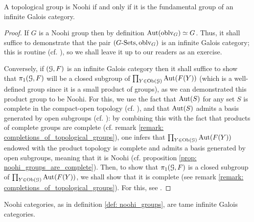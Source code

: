             \begin{lemma} \label{lemma: fundamental_groups_of_infinite_galois_categories_are_noohi}
                A topological group is Noohi if and only if it is the fundamental group of an infinite Galois category.
            \end{lemma}
                \begin{proof}
                    If $G$ is a Noohi group then by definition $\mathrm{Aut}(\mathrm{oblv}_G) \simeq G$. Thus, it shall suffice to demonstrate that the pair $(G\text{-}\mathrm{Sets}, \mathrm{oblv}_G)$ is an infinite Galois category; this is routine (cf. \cite[Section 3]{nlab:category_of_G_sets}), so we shall leave it up to our readers as an exercise.
                
                    Conversely, if $(\mathcal{G}, F)$ is an infinite Galois category then it shall suffice to show that $\pi_1(\mathcal{G}, F)$ will be a closed subgroup of $\prod_{Y \in \mathrm{Ob}(\mathcal{G})} \mathrm{Aut}(F(Y))$ (which is a well-defined group since it is a small product of groups), as we can demonstrated this product group to be Noohi. For this, we use the fact that $\mathrm{Aut}(S)$ for any set $S$ is complete in the compact-open topology (cf. \cite[Lemma 7.1.4]{bhatt_scholze_2014_pro_etale}), and that $\mathrm{Aut}(S)$ admits a basis generated by open subgroups (cf. \cite[\href{https://stacks.math.columbia.edu/tag/0BMC}{Tag 0BMC}]{stacks}): by combining this with the fact that products of complete groups are complete (cf. remark \ref{remark: completions_of_topological_groups}), one infers that $\prod_{Y \in \mathrm{Ob}(\mathcal{G})} \mathrm{Aut}(F(Y))$ endowed with the product topology is complete and admits a basis generated by open subgroups, meaning that it is Noohi (cf. proposition \ref{prop: noohi_groups_are_complete}). Then, to show that $\pi_1(\mathcal{G}, F)$ is a closed subgroup of $\prod_{Y \in \mathrm{Ob}(\mathcal{G})} \mathrm{Aut}(F(Y))$, we shall show that it is complete (see remark \ref{remark: completions_of_topological_groups}). For this, see \cite[\href{https://stacks.math.columbia.edu/tag/0BMR}{Tag 0BMR}]{stacks}.
                \end{proof}
            \begin{corollary} \label{coro: noohi_categories_are_tame}
                Noohi categories, as in definition \ref{def: noohi_groups}, are tame infinite Galois categories. 
            \end{corollary}
                
